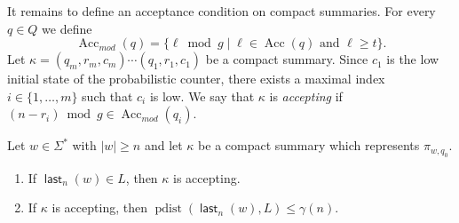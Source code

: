 \documentclass{article}\usepackage[a4paper,margin=20mm]{geometry}
\DeclareMathOperator{\last}{\mathsf{last}}
\DeclareMathOperator{\pdist}{pdist}
\DeclareMathOperator{\Acc}{Acc}
\renewcommand{\geq}{\geqslant}
\renewcommand{\leq}{\leqslant}
\renewcommand{\ge}{\geq}
\renewcommand{\le}{\leq}
\begin{document}
It remains to define an acceptance condition on compact summaries.
For every $q \in Q$ we define
\[
	\Acc_{\mathit{mod}}(q) = \{ \ell \bmod {g} \mid \ell \in \Acc(q) \text{ and } \ell \ge t\}.
\]
Let $\kappa = (q_m, r_m, c_m) \cdots (q_1, r_1, c_1)$ be a compact summary.
Since $c_1$ is the low initial state of the probabilistic counter, there exists a maximal index
$i \in \{1, \dots, m\}$ such that $c_i$ is low.
We say that $\kappa$ is {\em accepting} if $(n - r_i) \bmod g \in \Acc_{\mathit{mod}}(q_i)$.


\begin{proposition}
\label{prop:correctness}
Let $w \in \Sigma^*$ with $|w| \ge n$ and let $\kappa$ be a compact summary which represents $\pi_{w,q_0}$.
\begin{enumerate}[label=(\roman{*}), ref=(\roman{*})]
\item If $\last_n(w) \in L$, then $\kappa$ is accepting. \label{item:compact-acc}
\item If $\kappa$ is accepting, then $\pdist(\last_n(w),L) \le \gamma(n)$. \label{item:compact-rej}
\end{enumerate}
\end{proposition}
\end{document}
